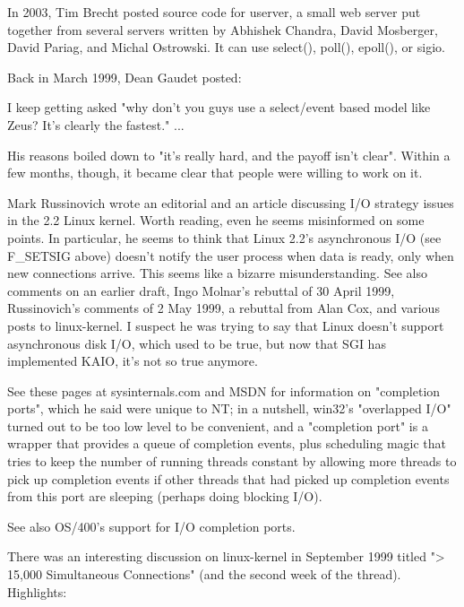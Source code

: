 \documentclass[12pt, twoside, a4paper, xetex]{report}
\begin{document}
In 2003, Tim Brecht posted source code for userver, a small web server put together from several servers written by Abhishek Chandra, David Mosberger, David Pariag, and Michal Ostrowski. It can use select(), poll(), epoll(), or sigio.

Back in March 1999, Dean Gaudet posted:

I keep getting asked "why don't you guys use a select/event based model like Zeus? It's clearly the fastest." ...

His reasons boiled down to "it's really hard, and the payoff isn't clear". Within a few months, though, it became clear that people were willing to work on it.

Mark Russinovich wrote an editorial and an article discussing I/O strategy issues in the 2.2 Linux kernel. Worth reading, even he seems misinformed on some points. In particular, he seems to think that Linux 2.2's asynchronous I/O (see F\_SETSIG above) doesn't notify the user process when data is ready, only when new connections arrive. This seems like a bizarre misunderstanding. See also comments on an earlier draft, Ingo Molnar's rebuttal of 30 April 1999, Russinovich's comments of 2 May 1999, a rebuttal from Alan Cox, and various posts to linux-kernel. I suspect he was trying to say that Linux doesn't support asynchronous disk I/O, which used to be true, but now that SGI has implemented KAIO, it's not so true anymore.

See these pages at sysinternals.com and MSDN for information on "completion ports", which he said were unique to NT; in a nutshell, win32's "overlapped I/O" turned out to be too low level to be convenient, and a "completion port" is a wrapper that provides a queue of completion events, plus scheduling magic that tries to keep the number of running threads constant by allowing more threads to pick up completion events if other threads that had picked up completion events from this port are sleeping (perhaps doing blocking I/O).

See also OS/400's support for I/O completion ports.

There was an interesting discussion on linux-kernel in September 1999 titled "> 15,000 Simultaneous Connections" (and the second week of the thread). Highlights:
\end{document}
